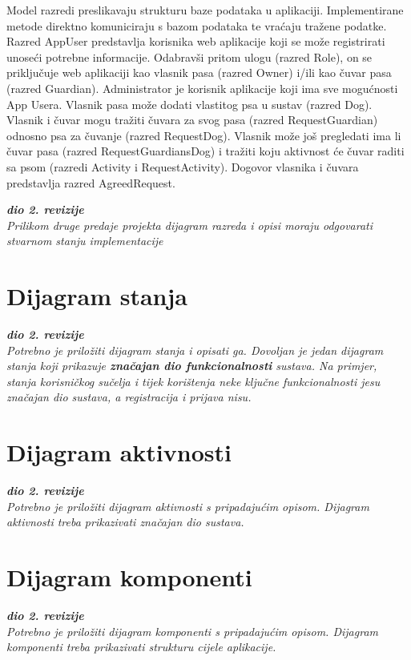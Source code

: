 			Model razredi preslikavaju strukturu baze podataka u aplikaciji. Implementirane metode direktno komuniciraju s bazom podataka te vraćaju tražene podatke.\\
			Razred AppUser predstavlja korisnika web aplikacije koji se može registrirati unoseći potrebne informacije. Odabravši pritom ulogu (razred Role), on se priključuje web aplikaciji kao vlasnik pasa (razred Owner) i/ili kao čuvar pasa (razred Guardian). Administrator je korisnik aplikacije koji ima sve mogućnosti App Usera. Vlasnik pasa može dodati vlastitog psa u sustav (razred Dog). Vlasnik i čuvar mogu tražiti čuvara za svog pasa (razred RequestGuardian) odnosno psa za čuvanje (razred RequestDog). Vlasnik može još pregledati ima li čuvar pasa (razred RequestGuardiansDog) i tražiti koju aktivnost će čuvar raditi sa psom (razredi Activity i RequestActivity). Dogovor vlasnika i čuvara predstavlja razred AgreedRequest.
			
			\eject
			
			\textbf{\textit{dio 2. revizije}}\\			
			
			\textit{Prilikom druge predaje projekta dijagram razreda i opisi moraju odgovarati stvarnom stanju implementacije}
			
			
			
			\eject
		
		\section{Dijagram stanja}
			
			
			\textbf{\textit{dio 2. revizije}}\\
			
			\textit{Potrebno je priložiti dijagram stanja i opisati ga. Dovoljan je jedan dijagram stanja koji prikazuje \textbf{značajan dio funkcionalnosti} sustava. Na primjer, stanja korisničkog sučelja i tijek korištenja neke ključne funkcionalnosti jesu značajan dio sustava, a registracija i prijava nisu. }
			
			
			\eject 
		
		\section{Dijagram aktivnosti}
			
			\textbf{\textit{dio 2. revizije}}\\
			
			 \textit{Potrebno je priložiti dijagram aktivnosti s pripadajućim opisom. Dijagram aktivnosti treba prikazivati značajan dio sustava.}
			
			\eject
		\section{Dijagram komponenti}
		
			\textbf{\textit{dio 2. revizije}}\\
		
			 \textit{Potrebno je priložiti dijagram komponenti s pripadajućim opisom. Dijagram komponenti treba prikazivati strukturu cijele aplikacije.}